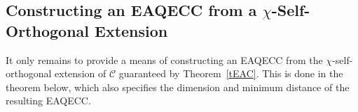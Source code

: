 \documentclass{article}
\DeclareMathOperator{\rank}{rank}
\theoremstyle{remark}
\theoremstyle{definition}
\numberwithin{equation}{section}
\begin{document}
%

\subsection{Constructing an EAQECC from a $\chi$-Self-Orthogonal Extension}
It only remains to provide a means of constructing an EAQECC from the $\chi$-self-orthogonal extension of $\mathcal{C}$ guaranteed by Theorem~\ref{tEAC}. This is done in the theorem below, which also specifies the dimension and minimum distance of the resulting EAQECC.
 
\end{document}
